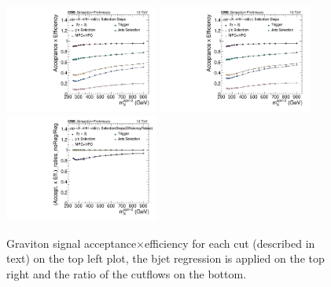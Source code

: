 \begin{figure}[thb]
  \centering
  \includegraphics[width=0.45\textwidth]{figures/sec-efficiency_plots/res_effs_Graviton.pdf}\hfil
  \includegraphics[width=0.45\textwidth]{figures/sec-efficiency_plots/wRegression/res_effs_Graviton_reg.pdf}\hfil
  \includegraphics[width=0.45\textwidth]{figures/sec-efficiency_plots/wRegression/res_effs_Graviton_regRatio.pdf}\hfil
  \caption{Graviton signal acceptance$\times$efficiency for each cut (described in text) on the top left plot, the bjet regression is applied on the top right  and the ratio of the cutflows on  the bottom.}
  \label{fig:cutflow-signal-Graviton}
\end{figure}


